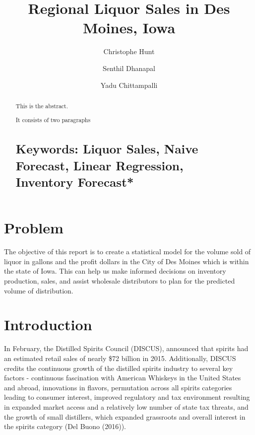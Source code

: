 \documentclass[]{elsarticle} %
\begin{document}
\begin{frontmatter}

  \title{Regional Liquor Sales in Des Moines, Iowa}
    \author[CUNY School of Professional Studies]{Christophe Hunt}
    \author[CUNY School of Professional Studies]{Senthil Dhanapal}
  
    \author[CUNY School of Professional Studies]{Yadu Chittampalli}
  
      \address[CUNY School of Professional Studies]{CUNY School of Professional Studies, Data Analytics, New York, NY}
  
  \begin{abstract}
  This is the abstract.
  
  It consists of two paragraphs
  
  \section{Keywords: Liquor Sales, Naive Forecast, Linear Regression,
  Inventory
  Forecast*}\label{keywords-liquor-sales-naive-forecast-linear-regression-inventory-forecast}
  \end{abstract}
  
 \end{frontmatter}

\section{Problem}\label{problem}

The objective of this report is to create a statistical model for the
volume sold of liquor in gallons and the profit dollars in the City of
Des Moines which is within the state of Iowa. This can help us make
informed decisions on inventory production, sales, and assist wholesale
distributors to plan for the predicted volume of distribution.

\section{Introduction}\label{introduction}

In February, the Distilled Spirits Council (DISCUS), announced that
spirits had an estimated retail sales of nearly \$72 billion in 2015.
Additionally, DISCUS credits the continuous growth of the distilled
spirits industry to several key factors - continuous fascination with
American Whiskeys in the United States and abroad, innovations in
flavors, permutation across all spirits categories leading to consumer
interest, improved regulatory and tax environment resulting in expanded
market access and a relatively low number of state tax threats, and the
growth of small distillers, which expanded grassroots and overall
interest in the spirits category (Del Buono (2016)).
\end{document}
